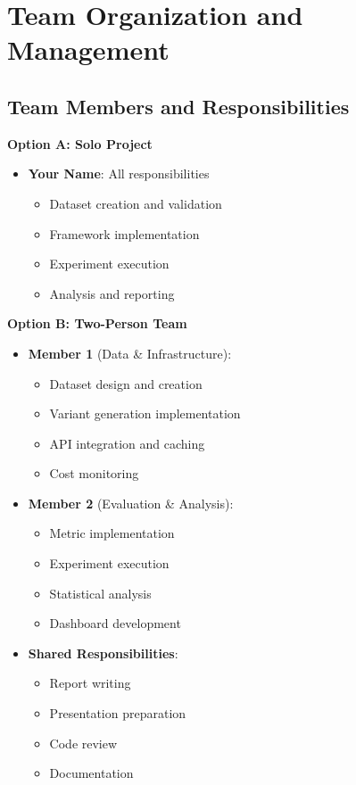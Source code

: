 \documentclass[11pt,a4paper]{article}
\begin{document}
\section{Team Organization and Management}

\subsection{Team Members and Responsibilities}

\textbf{Option A: Solo Project}

\begin{itemize}[leftmargin=*]
    \item \textbf{Your Name}: All responsibilities
    \begin{itemize}
        \item Dataset creation and validation
        \item Framework implementation
        \item Experiment execution
        \item Analysis and reporting
    \end{itemize}
\end{itemize}

\textbf{Option B: Two-Person Team}

\begin{itemize}[leftmargin=*]
    \item \textbf{Member 1} (Data \& Infrastructure):
    \begin{itemize}
        \item Dataset design and creation
        \item Variant generation implementation
        \item API integration and caching
        \item Cost monitoring
    \end{itemize}
    
    \item \textbf{Member 2} (Evaluation \& Analysis):
    \begin{itemize}
        \item Metric implementation
        \item Experiment execution
        \item Statistical analysis
        \item Dashboard development
    \end{itemize}
    
    \item \textbf{Shared Responsibilities}:
    \begin{itemize}
        \item Report writing
        \item Presentation preparation
        \item Code review
        \item Documentation
    \end{itemize}
\end{itemize}
\end{document}
